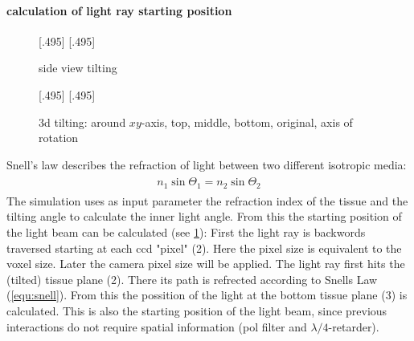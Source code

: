 \paragraph{calculation of light ray starting position}
% 
\begin{figure}[!t]
\def\tikzwidth{0.42\textwidth}
% 
[.495\textwidth]{
\def\tilt{0}
\def\nindex{2.25}
}
% 
[.495\textwidth]{
\def\tilt{20}
\def\nindex{2.25}
}
\caption{side view tilting}
\label{fig:tilted_side_view}
\end{figure}
% 
\begin{figure}[!t]
% 
\def\tikzheight{0.42\textwidth}
\def\azimuth{0}
\def\elevation{90}
\def\dz{2}
[.495\textwidth]{
}
% 
\def\azimuth{20}
\def\elevation{25}
\def\dz{1}
[.495\textwidth]{
}
% 
\tikzset{external/export=false}
\caption[3d tilting]{3d tilting: around $xy$-axis, \raisebox{.25em}{\tikz \draw[red,thick](0,0)--(0.25,0);} top, \raisebox{.25em}{\tikz \draw[green!50!black,thick](0,0)--(0.25,0);} middle, \raisebox{.25em}{\tikz \draw[blue,thick](0,0)--(0.25,0);} bottom, \raisebox{.25em}{\tikz \draw[dash pattern=on 1.25pt off 1.25pt,thick](0,0)--(0.25,0);} original, \raisebox{.25em}{\tikz \draw[gray](0,0)--(0.25,0);} axis of rotation }
\end{figure}
% 
Snell's law describes the refraction of light between two different isotropic media:
\begin{align}
\begin{split}
    n_1 \sin{\Theta_1} = n_2 \sin{\Theta_2}
\end{split}
\label{equ:snell}
\end{align}
% 
The simulation uses as input parameter the refraction index of the tissue and the tilting angle to calculate the inner light angle.
From this the starting position of the light beam can be calculated (see \cref{fig:tilted_side_view}):
% 
First the light ray is backwords traversed starting at each ccd "pixel" (2).
Here the pixel size is equivalent to the voxel size.
Later the camera pixel size will be applied.
The light ray first hits the (tilted) tissue plane (2).
There its path is refrected according to Snells Law (\cref{equ:snell}).
From this the possition of the light at the bottom tissue plane (3) is calculated.
This is also the starting position of the light beam, since previous interactions do not require spatial information (\ie pol filter and $\lambda/4$-retarder).\\
